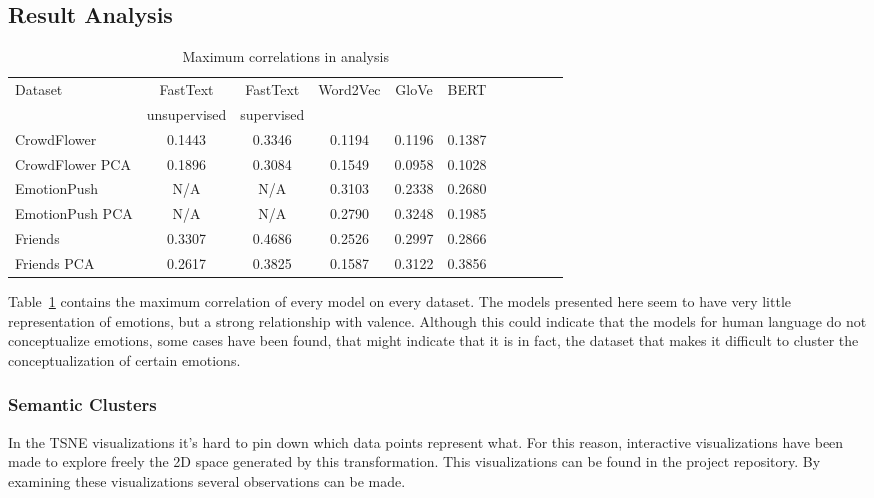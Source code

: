 \subsection{Result Analysis}\label{sub:Result Analysis}
\begin{table}
  \begin{tabular}{|l|c|c|c|c|c|c|c|c|c|c|}
    \hline
    Dataset         & FastText     & FastText   & Word2Vec & GloVe  & BERT   \\
                    & unsupervised & supervised &          &        &        \\
    \hline
    CrowdFlower     & 0.1443       & 0.3346     & 0.1194   & 0.1196 & 0.1387 \\
    CrowdFlower PCA & 0.1896       & 0.3084     & 0.1549   & 0.0958 & 0.1028 \\
    EmotionPush     & N/A          & N/A        & 0.3103   & 0.2338 & 0.2680 \\
    EmotionPush PCA & N/A          & N/A        & 0.2790   & 0.3248 & 0.1985 \\
    Friends         & 0.3307       & 0.4686     & 0.2526   & 0.2997 & 0.2866 \\
    Friends PCA     & 0.2617       & 0.3825     & 0.1587   & 0.3122 & 0.3856 \\
    \hline
  \end{tabular}
  \caption{Maximum correlations in analysis}\label{tab:summary}
\end{table}
Table~\ref{tab:summary} contains the maximum correlation of every model on every dataset. The models presented here seem to have very little representation of emotions, but a strong relationship with valence. Although this could indicate that the models for human language do not conceptualize emotions, some cases have been found, that might indicate that it is in fact, the dataset that makes it difficult to cluster the conceptualization of certain emotions.

\subsubsection{Semantic Clusters}
In the TSNE visualizations it's hard to pin down which data points represent what. For this reason, interactive visualizations have been made to explore freely the 2D space generated by this transformation. This visualizations can be found in the project repository. By examining these visualizations several observations can be made.

